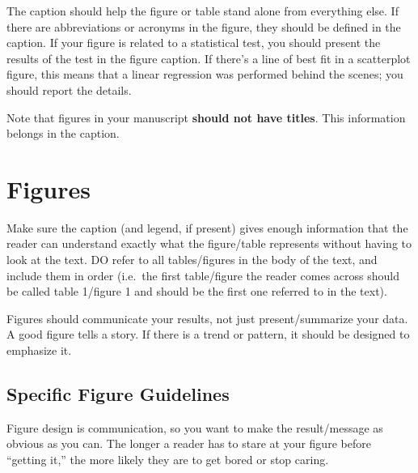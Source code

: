 \documentclass[]{book}
\begin{document}
The caption should help the figure or table stand alone from everything
else. If there are abbreviations or acronyms in the figure, they should
be defined in the caption. If your figure is related to a statistical
test, you should present the results of the test in the figure caption.
If there's a line of best fit in a scatterplot figure, this means that a
linear regression was performed behind the scenes; you should report the
details.

Note that figures in your manuscript \textbf{should not have titles}.
This information belongs in the caption.

\section{Figures}\label{figures}

Make sure the caption (and legend, if present) gives enough information
that the reader can understand exactly what the figure/table represents
without having to look at the text. DO refer to all tables/figures in
the body of the text, and include them in order (i.e.~the first
table/figure the reader comes across should be called table 1/figure 1
and should be the first one referred to in the text).

Figures should communicate your results, not just present/summarize your
data. A good figure tells a story. If there is a trend or pattern, it
should be designed to emphasize it.

\subsection{Specific Figure
Guidelines}\label{specific-figure-guidelines}

Figure design is communication, so you want to make the result/message
as obvious as you can. The longer a reader has to stare at your figure
before ``getting it,'' the more likely they are to get bored or stop
caring.
\end{document}
